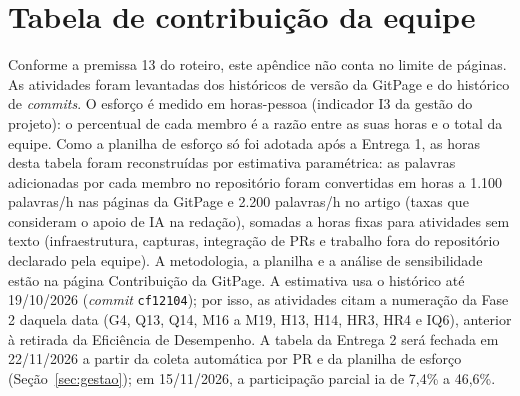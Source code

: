 \appendices
\section{Tabela de contribuição da equipe}
\label{ap:contribuicao}

Conforme a premissa 13 do roteiro, este apêndice não conta no limite de páginas. As atividades foram levantadas dos históricos de versão da GitPage e do histórico de \textit{commits}. O esforço é medido em horas-pessoa (indicador I3 da gestão do projeto): o percentual de cada membro é a razão entre as suas horas e o total da equipe. Como a planilha de esforço só foi adotada após a Entrega 1, as horas desta tabela foram reconstruídas por estimativa paramétrica: as palavras adicionadas por cada membro no repositório foram convertidas em horas a 1.100 palavras/h nas páginas da GitPage e 2.200 palavras/h no artigo (taxas que consideram o apoio de IA na redação), somadas a horas fixas para atividades sem texto (infraestrutura, capturas, integração de PRs e trabalho fora do repositório declarado pela equipe). A metodologia, a planilha e a análise de sensibilidade estão na página Contribuição da GitPage. A estimativa usa o histórico até 19/10/2026 (\textit{commit} \texttt{cf12104}); por isso, as atividades citam a numeração da Fase 2 daquela data (G4, Q13, Q14, M16 a M19, H13, H14, HR3, HR4 e IQ6), anterior à retirada da Eficiência de Desempenho. A tabela da Entrega 2 será fechada em 22/11/2026 a partir da coleta automática por PR e da planilha de esforço (Seção~\ref{sec:gestao}); em 15/11/2026, a participação parcial ia de 7,4\% a 46,6\%.

